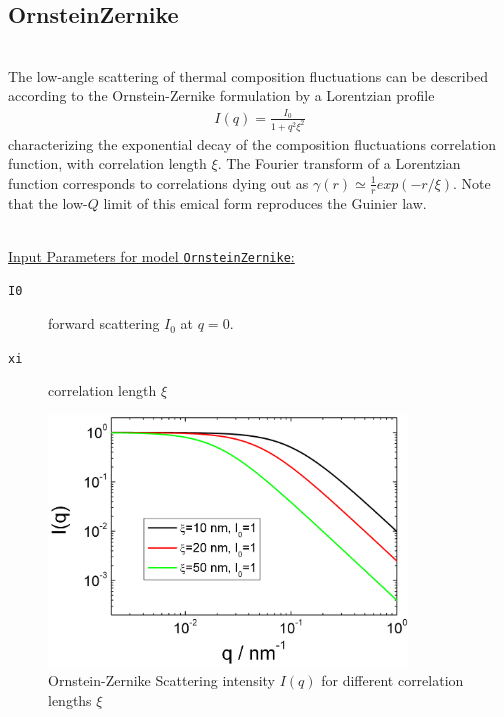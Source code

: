 \clearpage
\subsection{OrnsteinZernike}
\label{sect:Zernike}
 ~\\
The low-angle scattering of thermal composition fluctuations can be
described according to the Ornstein-Zernike formulation by a
Lorentzian profile
\begin{align}
I(q) = \frac{I_0}{1+q^2\xi^2}
\end{align}
characterizing the exponential decay of the composition fluctuations
correlation function, with correlation length $\xi$. The Fourier
transform of a Lorentzian function corresponds to correlations dying
out as $\gamma(r) \simeq \frac{1}{r}exp(-r/\xi)$. Note that the
low-$Q$ limit of this emical form reproduces the Guinier law.

\hspace{1pt}\\
\underline{Input Parameters for model \texttt{OrnsteinZernike}:}\\
\begin{description}
\item[\texttt{I0}] forward scattering $I_0$ at $q=0$.
\item[\texttt{xi}] correlation length $\xi$
\end{description}

\begin{figure}[htb]
\begin{center}
\includegraphics[width=0.85\textwidth]{OrnsteinZernicke.png}
\end{center}
\caption{Ornstein-Zernike Scattering intensity $I(q)$ for different
correlation lengths $\xi$} \label{fig:OrnsteinZernicke}
\end{figure}
\clearpage

